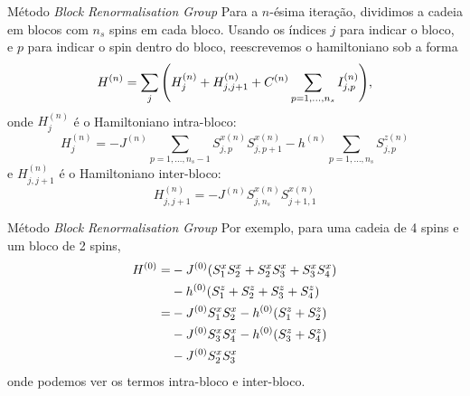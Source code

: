 \documentclass[brazil]{beamer}
\begin{document}
\begin{frame}{Método \textit{Block Renormalisation Group}}
    Para a \( n \)-ésima iteração, dividimos a cadeia em blocos com \( n_s \) spins em cada bloco.
    Usando os índices \( j \) para indicar o bloco, e \( p \) para indicar o spin dentro do bloco, reescrevemos o hamiltoniano sob a forma
    \begin{equation}
        H^{(n)} = \sum_j \qty( H_j^{(n)} + H_{j, j + 1}^{(n)} + C^{(n)} \sum_{p = 1, \dotsc , n_s} I_{j, p}^{(n)} ) , \label{H_j}
    \end{equation}
    onde \( H_j^{(n)} \) é o Hamiltoniano intra-bloco:
    \begin{equation}
        H_j^{(n)} = - J^{(n)} \sum_{p = 1, \dotsc, n_s - 1} S_{j, p}^{x(n)} S_{j, p + 1}^{x(n)} - h^{(n)} \sum_{p = 1, \dotsc, n_s} S_{j, p}^{z(n)}
    \end{equation}
    e \( H_{j, j + 1}^{(n)} \) é o Hamiltoniano inter-bloco:
    \begin{equation}
        H_{j, j + 1}^{(n)} = - J^{(n)} S_{j, n_s}^{x(n)} S_{j + 1, 1}^{x(n)}
    \end{equation}
\end{frame}

\begin{frame}{Método \textit{Block Renormalisation Group}}
    Por exemplo, para uma cadeia de 4 spins e um bloco de 2 spins,
    \begin{align}
        H^{(0)} = & - J^{(0)} \qty( S_1^x S_2^x + S_2^x S_3^x + S_3^x S_4^x ) \\
                  & - h^{(0)} \qty( S_1^z + S_2^z + S_3^z + S_4^z )           \\
        =         & - J^{(0)} S_1^x S_2^x - h^{(0)} ( S_1^z + S_2^z )         \\
                  & - J^{(0)} S_3^x S_4^x - h^{(0)} ( S_3^z + S_4^z )         \\
                  & - J^{(0)} S_2^x S_3^x
    \end{align}
    onde podemos ver os termos intra-bloco e inter-bloco.
\end{frame}
\end{document}
